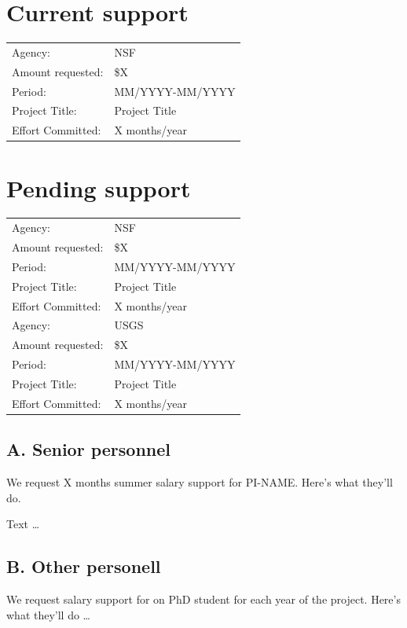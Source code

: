 \documentclass{proposalnsf}
\begin{document}
\section*{Current support}
\begin{tabular}{p{}p{}}\hline
Agency: 			& NSF						\\
Amount requested: 	& \$X					\\
Period: 			& MM/YYYY-MM/YYYY			\\
Project Title:		& Project Title \\
Effort Committed: 	& X months/year				\\\hline
\end{tabular}

\section*{Pending support}
\begin{tabular}{p{}p{}}\hline
Agency: 			& NSF						\\
Amount requested: 	& \$X					\\
Period: 			& MM/YYYY-MM/YYYY			\\
Project Title:		& Project Title \\
Effort Committed: 	& X months/year				\\\hline
Agency: 			& USGS						\\
Amount requested: 	& \$X					\\
Period: 			& MM/YYYY-MM/YYYY			\\
Project Title:		& Project Title \\
Effort Committed: 	& X months/year				\\\hline
\end{tabular}



\newpage
{}
\renewcommand{\thepage} {G--\arabic{page}}

\subsection*{A. Senior personnel}
 We request X months summer salary support for PI-NAME. Here's what they'll do.

 Text \dots

\subsection*{B. Other personell}
 We request salary support for on PhD student for each year of the project. Here's what they'll do \dots
\end{document}

